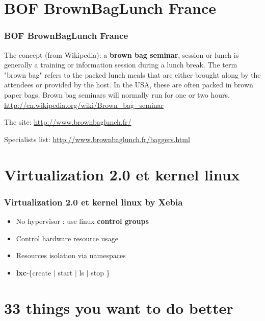 \documentclass[presentation]{beamer}
\begin{document}
\section{BOF BrownBagLunch France}

\begin{frame}
\frametitle{BOF BrownBagLunch France}

The concept (from Wikipedia):
a \textbf{brown bag seminar}, session or lunch is generally a training or information session during a lunch break. The term "brown bag" refers to the packed lunch meals that are either brought along by the attendees or provided by the host. In the USA, these are often packed in brown paper bags. Brown bag seminars will normally run for one or two hours.
\url{http://en.wikipedia.org/wiki/Brown_bag_seminar}

\vskip5pt
The site:
\url{http://www.brownbaglunch.fr/}

\vskip5pt
Specialists list:
\url{http://www.brownbaglunch.fr/baggers.html}

\end{frame}

\section{Virtualization 2.0 et kernel linux}

\begin{frame}
\frametitle{Virtualization 2.0 et kernel linux by Xebia}

\begin{itemize}
\item No hypervisor : use linux \textbf{control groups}
\item Control hardware resource usage
\item Resources isolation via namespaces
\item \textbf{lxc}-\{create $\vert$ start $\vert$ ls $\vert$ stop \}
\end{itemize}

\end{frame}

\section{33 things you want to do better}
\end{document}
